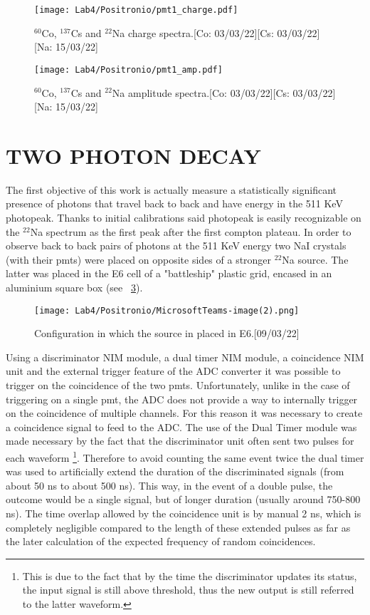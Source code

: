 \documentclass[10pt,a4paper,twocolumn]{article}
\begin{document}
 \begin{figure}[h!]
\centering
\texttt{[image: Lab4/Positronio/pmt1\_charge.pdf]} 
\caption{$^{60}$Co, $^{137}$Cs and $^{22}$Na charge spectra.[Co: 03/03/22][Cs: 03/03/22][Na: 15/03/22]}
\label{fig:chargespectra}
\end{figure}

 \begin{figure}[h!]
\centering
\texttt{[image: Lab4/Positronio/pmt1\_amp.pdf]} 
\caption{$^{60}$Co, $^{137}$Cs and $^{22}$Na amplitude spectra.[Co: 03/03/22][Cs: 03/03/22][Na: 15/03/22]}
\label{fig:amplitudespectra}
\end{figure}

\section{TWO PHOTON DECAY}

The first objective of this work is actually measure a statistically significant presence of photons that travel back to back and have energy in the 511 KeV photopeak. Thanks to initial calibrations said photopeak is easily recognizable on the $^{22}$Na spectrum as the first peak after the first compton plateau. In order to observe back to back pairs of photons at the 511 KeV energy two NaI crystals (with their pmts) were placed on opposite sides of a stronger $^{22}$Na source. The latter was placed in the E6 cell of a "battleship" plastic grid, encased in an aluminium square box (see \figurename~\ref{fig:e6config}).

 \begin{figure}[h!]
\centering
\texttt{[image: Lab4/Positronio/MicrosoftTeams-image(2).png]} 
\caption{Configuration in which the source in placed in E6.[09/03/22]}
\label{fig:e6config}
\end{figure}

Using a discriminator NIM module, a dual timer NIM module, a coincidence NIM unit and the external trigger feature of the ADC converter it was possible to trigger on the coincidence of the two pmts. Unfortunately, unlike in the case of triggering on a single pmt, the ADC does not provide a way to internally trigger on the coincidence of multiple channels. For this reason it was necessary to create a coincidence signal to feed to the ADC. The use of the Dual Timer module was made necessary by the fact that the discriminator unit often sent two pulses for each waveform \footnote{This is due to the fact that by the time the discriminator updates its status, the input signal is still above threshold, thus the new output is still referred to the latter waveform.}. Therefore to avoid counting the same event twice the dual timer was used to artificially extend the duration of the discriminated signals (from  about 50 ns to about 500 ns). This way, in the event of a double pulse, the outcome would be a single signal, but of longer duration (usually around 750-800 ns). The time overlap allowed by the coincidence unit is by manual 2 ns, which is completely negligible compared to the length of these extended pulses as far as the later calculation of the expected frequency of random coincidences.
\end{document}
